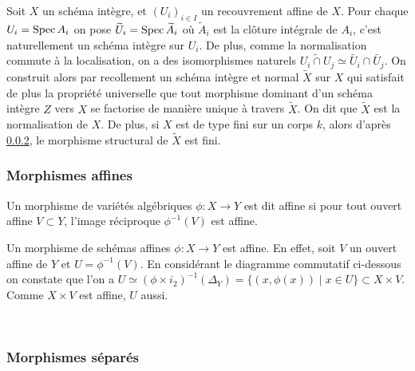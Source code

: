 Soit $X$ un schéma intègre, et $(U_i)_{i\in I}$ un recouvrement affine de $X$. Pour chaque $U_i=\operatorname{Spec} A_i$ on pose $\widetilde{U}_i=\operatorname{Spec} \widetilde{A}_i$ où $\widetilde{A}_i$ est la clôture intégrale de $A_i$, c'est naturellement un schéma intègre sur $U_i$. De plus, comme la normalisation commute à la localisation, on a des isomorphismes naturels $\widetilde{U_i\cap U_j}\simeq \widetilde{U_i}\cap \widetilde{U_j}$. On construit alors par recollement un schéma intègre et normal $\widetilde{X}$ sur $X$ qui satisfait de plus la propriété universelle que tout morphisme dominant d'un schéma intègre $Z$ vers $X$ se factorise de manière unique à travers $\widetilde{X}$. On dit que $\widetilde{X}$ est la normalisation de $X$. De plus, si $X$ est de type fini sur un corps $k$, alors d'après \ref{}, le morphisme structural de $\widetilde{X}$ est fini.

\subsubsection{Morphismes affines}

\begin{defn}
Un morphisme de variétés algébriques $\phi: X\rightarrow Y$ est dit affine si pour tout ouvert affine $V\subset Y$, l'image réciproque $\phi^{-1}(V)$ est affine.
\end{defn}

\begin{ex}\label{exaff}
Un morphisme de schémas affines $\phi: X\rightarrow Y$ est affine. En effet, soit $V$ un ouvert affine de $Y$ et $U=\phi^{-1}(V)$. En considérant le diagramme commutatif ci-dessous on constate que l'on a $U \simeq (\phi\times i_2)^{-1}(\Delta_Y)=\lbrace (x,\phi(x))\mid x\in U \rbrace \subset X\times V$. Comme $X\times V$ est affine, $U$ aussi.
	\begin{center}
	\\
	\end{center}

\end{ex}

\subsubsection{Morphismes séparés}

